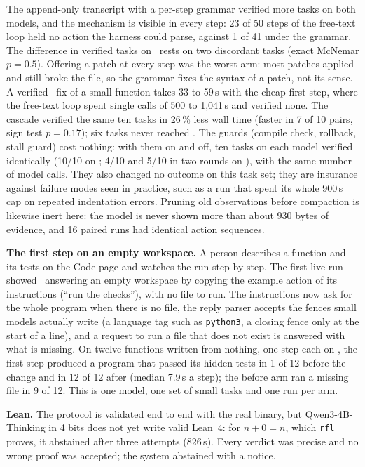 The append-only transcript with a per-step grammar verified more tasks on
both models, and the mechanism is visible in every step: 23 of 50 steps of
the free-text loop held no action the harness could parse, against 1 of 41
under the grammar. The difference in verified tasks on \Sone\ rests on two
discordant tasks (exact McNemar $p=0.5$). Offering a patch at every step was
the worst arm: most patches applied and still broke the file, so the grammar
fixes the syntax of a patch, not its sense. A verified \Stwo\ fix of a small
function takes 33 to 59\,s with the cheap first step, where the free-text
loop spent single calls of 500 to 1{,}041\,s and verified none. The cascade
verified the same ten tasks in 26\,\% less wall time (faster in 7 of 10
pairs, sign test $p=0.17$); six tasks never reached \Stwo. The guards
(compile check, rollback, stall guard) cost nothing: with them on and off,
ten tasks on each model verified identically (10/10 on \Stwo; 4/10 and 5/10
in two rounds on \Sone), with the same number of model calls. They also
changed no outcome on this task set; they are insurance against failure
modes seen in practice, such as a run that spent its whole 900\,s cap on
repeated indentation errors. Pruning old observations before compaction is
likewise inert here: the model is never shown more than about 930 bytes of
evidence, and 16 paired runs had identical action sequences.

\textbf{The first step on an empty workspace.} A person describes a function
and its tests on the Code page and watches the run step by step. The first
live run showed \Sone\ answering an empty workspace by copying the example
action of its instructions (``run the checks''), with no file to run. The
instructions now ask for the whole program when there is no file, the reply
parser accepts the fences small models actually write (a language tag such as
\texttt{python3}, a closing fence only at the start of a line), and a request
to run a file that does not exist is answered with what is missing. On twelve
functions written from nothing, one step each on \Sone, the first step
produced a program that passed its hidden tests in 1 of 12 before the change
and in 12 of 12 after (median 7.9\,s a step); the before arm ran a missing
file in 9 of 12. This is one model, one set of small tasks and one run per
arm.

\textbf{Lean.} The protocol is validated end to end with the real binary, but
Qwen3-4B-Thinking in 4 bits does not yet write valid Lean~4: for $n+0=n$,
which \texttt{rfl} proves, it abstained after three attempts (826\,s). Every
verdict was precise and no wrong proof was accepted; the system abstained
with a notice.

